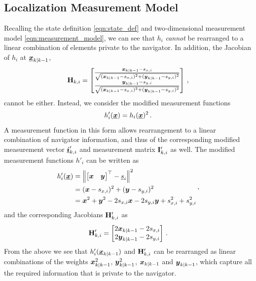 \documentclass[10pt,letterpaper,oneside,twocolumn,journal]{IEEEtran}
\theoremstyle{definition}
\theoremstyle{definition}
\theoremstyle{remark}
\begin{document}
\subsection{Localization Measurement Model} \label{subsec:observation_model}
Recalling the state definition \eqref{eqn:state_def} and two-dimensional measurement model \eqref{eqn:measurement_model}, we can see that $h_i$ \textit{cannot} be rearranged to a linear combination of elements private to the navigator. In addition, the Jacobian of $h_i$ at ${\boldsymbol{\underline{x}}}_{k|k-1}$,
\begin{equation}
    {\ensuremath{{\mathbf{H}}}}_{k,i} = 
    \begin{bmatrix}
        \frac{{\boldsymbol{x}}_{k|k-1} - s_{x,i}}{\sqrt{({\boldsymbol{x}}_{k|k-1} - s_{x,i})^2 + ({\boldsymbol{y}}_{k|k-1} - s_{y,i})^2}} \\
        \frac{{\boldsymbol{y}}_{k|k-1} - s_{y,i}}{\sqrt{({\boldsymbol{x}}_{k|k-1} - s_{x,i})^2 + ({\boldsymbol{y}}_{k|k-1} - s_{y,i})^2}} 
    \end{bmatrix}\,,
\end{equation}
cannot be either. Instead, we consider the modified measurement functions
\begin{equation}
    h'_i(\rvec{x}) = h_i(\rvec{x})^2\,. \label{eqn:modified_measurement_func}
\end{equation}
A measurement function in this form allows rearrangement to a linear combination of navigator information, and thus of the corresponding modified measurement vector ${\boldsymbol{\underline{i}}}'_{k,i}$ and measurement matrix ${{\mathbf{I}}}'_{k,i}$ as well. The modified measurement functions $h'_i$ can be written as
\begin{equation}
    \begin{split}
        h'_i({\boldsymbol{\underline{x}}}) &= \left\lVert
        \begin{bmatrix}
            {\boldsymbol{x}} & {\boldsymbol{y}}
        \end{bmatrix}^\top - {\underline{s}}_i\right\rVert^2 \\
        &= ({\boldsymbol{x}} - s_{x,i})^2 + ({\boldsymbol{y}} - s_{y,i})^2 \\
        &= {\boldsymbol{x}}^2 + {\boldsymbol{y}}^2 -2s_{x,i}{\boldsymbol{x}} -2s_{y,i}{\boldsymbol{y}} +s_{x,i}^2 +s_{y,i}^2
    \end{split}\,,
\end{equation}
and the corresponding Jacobians ${{\mathbf{H}}}'_{k,i}$ as
\begin{equation}
    \mat{H}'_{k,i} = 
    \begin{bmatrix}
        2\rv{x}_{k|k-1} - 2s_{x,i} \\
        2\rv{y}_{k|k-1} - 2s_{y,i}
    \end{bmatrix}\,. \label{eqn:modified_jacobian}
\end{equation}
From the above we see that $h'_i({\boldsymbol{\underline{x}}}_{k|k-1})$ and ${{\mathbf{H}}}'_{k,i}$ can be rearranged as linear combinations of the weights ${\boldsymbol{x}}_{k|k-1}^2$, ${\boldsymbol{y}}_{k|k-1}^2$, ${\boldsymbol{x}}_{k|k-1}$ and ${\boldsymbol{y}}_{k|k-1}$, which capture all the required information that is private to the navigator. 
\end{document}
